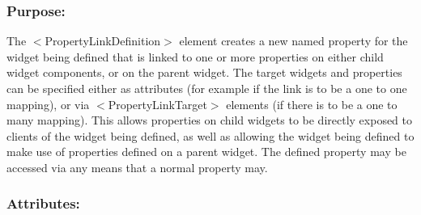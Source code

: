 \hypertarget{fal_element_ref_fal_elem_ref_sec_27_1}{}\subsubsection{Purpose\+:}\label{fal_element_ref_fal_elem_ref_sec_27_1}
The {\ttfamily $<$Property\+Link\+Definition$>$} element creates a new named property for the widget being defined that is linked to one or more properties on either child widget components, or on the parent widget. The target widgets and properties can be specified either as attributes (for example if the link is to be a one to one mapping), or via $<$Property\+Link\+Target$>$ elements (if there is to be a one to many mapping). This allows properties on child widgets to be directly exposed to clients of the widget being defined, as well as allowing the widget being defined to make use of properties defined on a parent widget. The defined property may be accessed via any means that a \textquotesingle{}normal\textquotesingle{} property may.\hypertarget{fal_element_ref_fal_elem_ref_sec_27_2}{}\subsubsection{Attributes\+:}\label{fal_element_ref_fal_elem_ref_sec_27_2}
